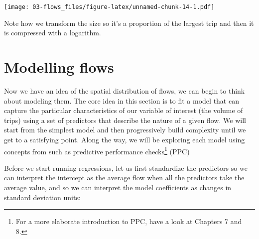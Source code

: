 \documentclass[]{book}
\newenvironment{Shaded}{\begin{snugshade}}{\end{snugshade}}
\newcommand{\CommentTok}[1]{\textcolor[rgb]{0.56,0.35,0.01}{\textit{#1}}}
\newcommand{\KeywordTok}[1]{\textcolor[rgb]{0.13,0.29,0.53}{\textbf{#1}}}
\newcommand{\NormalTok}[1]{#1}
\newcommand{\OperatorTok}[1]{\textcolor[rgb]{0.81,0.36,0.00}{\textbf{#1}}}
\newcommand{\StringTok}[1]{\textcolor[rgb]{0.31,0.60,0.02}{#1}}
\let\rmarkdownfootnote\footnote%
\def\footnote{\protect\rmarkdownfootnote}
\begin{document}
\texttt{[image: 03-flows\_files/figure-latex/unnamed-chunk-14-1.pdf]}

Note how we transform the size so it's a proportion of the largest trip and then it is compressed with a logarithm.

\hypertarget{modelling-flows}{%
\section{Modelling flows}\label{modelling-flows}}

Now we have an idea of the spatial distribution of flows, we can begin to think about modeling them. The core idea in this section is to fit a model that can capture the particular characteristics of our variable of interest (the volume of trips) using a set of predictors that describe the nature of a given flow. We will start from the simplest model and then progressively build complexity until we get to a satisfying point. Along the way, we will be exploring each model using concepts from \citet{gelman2006data} such as predictive performance checks\footnote{For a more elaborate introduction to PPC, have a look at Chapters 7 and 8.} (PPC)

Before we start running regressions, let us first standardize the predictors so we can interpret the intercept as the average flow when all the predictors take the average value, and so we can interpret the model coefficients as changes in standard deviation units:

\begin{Shaded}
\end{Shaded}
\end{document}
